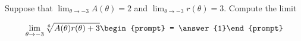 \documentclass{ximera}
\author{Matthew Carr}
\begin{document}
\begin{exercise}
Suppose that $\lim_{\theta\to-3}A(\theta)=2$ and $\lim_{\theta\to-3}r(\theta)=3$. Compute the limit

\[
\lim_{\theta\to -3 } \sqrt[6]{A(\theta)r(\theta)+3}\begin{prompt} = \answer{1}\end{prompt}
\]
\end{exercise}
\end{document}

